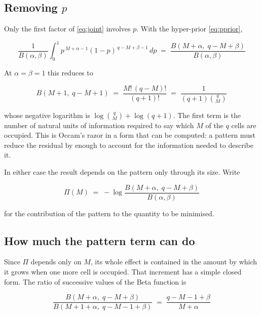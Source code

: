 \subsection{Removing $p$}

Only the first factor of \eqref{eq:joint} involves $p$. With the hyper-prior
\eqref{eq:pprior},

\begin{equation}
\frac{1}{B(\alpha,\beta)} \int_{0}^{1}
p^{\,M+\alpha-1} (1-p)^{\,q-M+\beta-1} \, dp
\;=\; \frac{B(M+\alpha,\; q-M+\beta)}{B(\alpha,\beta)}
\label{eq:pint}
\end{equation}

At $\alpha = \beta = 1$ this reduces to

\begin{equation}
B(M+1,\; q-M+1) \;=\; \frac{M!\,(q-M)!}{(q+1)!}
\;=\; \frac{1}{(q+1) \binom{q}{M}}
\label{eq:pintuniform}
\end{equation}

whose negative logarithm is $\log \binom{q}{M} + \log(q+1)$. The first term is the
number of natural units of information required to say which $M$ of the $q$ cells are
occupied. This is Occam's razor in a form that can be computed: a pattern must reduce
the residual by enough to account for the information needed to describe it.

In either case the result depends on the pattern only through its size. Write

\begin{equation}
\Pi(M) \;=\; -\log \frac{B(M+\alpha,\; q-M+\beta)}{B(\alpha,\beta)}
\label{eq:Pi}
\end{equation}

for the contribution of the pattern to the quantity to be minimised.

\subsection{How much the pattern term can do}
\label{sec:patterncost}

Since $\Pi$ depends only on $M$, its whole effect is contained in the amount by which
it grows when one more cell is occupied. That increment has a simple closed form. The
ratio of successive values of the Beta function is

\begin{equation}
\frac{B(M+\alpha,\; q-M+\beta)}{B(M+1+\alpha,\; q-M-1+\beta)}
\;=\; \frac{q-M-1+\beta}{M+\alpha}
\label{eq:ratio}
\end{equation}

